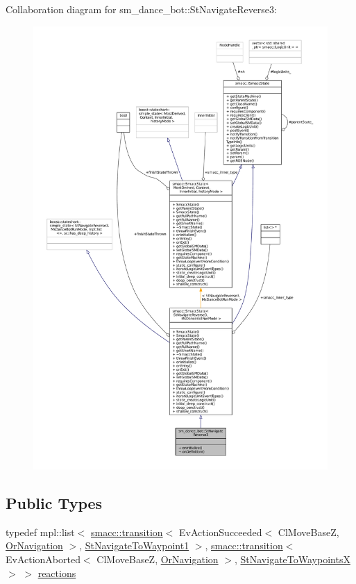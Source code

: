Collaboration diagram for sm\+\_\+dance\+\_\+bot\+:\+:St\+Navigate\+Reverse3\+:
\nopagebreak
\begin{figure}[H]
\begin{center}
\leavevmode
\includegraphics[width=350pt]{structsm__dance__bot_1_1StNavigateReverse3__coll__graph}
\end{center}
\end{figure}
\subsection*{Public Types}
\begin{DoxyCompactItemize}
\item 
typedef mpl\+::list$<$ \hyperlink{classsmacc_1_1transition}{smacc\+::transition}$<$ Ev\+Action\+Succeeded$<$ Cl\+Move\+BaseZ, \hyperlink{classsm__dance__bot_1_1OrNavigation}{Or\+Navigation} $>$, \hyperlink{structsm__dance__bot_1_1StNavigateToWaypoint1}{St\+Navigate\+To\+Waypoint1} $>$, \hyperlink{classsmacc_1_1transition}{smacc\+::transition}$<$ Ev\+Action\+Aborted$<$ Cl\+Move\+BaseZ, \hyperlink{classsm__dance__bot_1_1OrNavigation}{Or\+Navigation} $>$, \hyperlink{structsm__dance__bot_1_1StNavigateToWaypointsX}{St\+Navigate\+To\+WaypointsX} $>$ $>$ \hyperlink{structsm__dance__bot_1_1StNavigateReverse3_ae3d0ccf67dbf96dd45f316254491c022}{reactions}
\end{DoxyCompactItemize}
